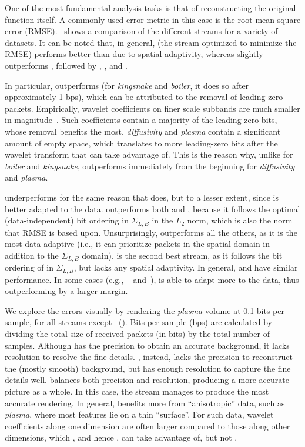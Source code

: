 One of the most fundamental analysis tasks is that of reconstructing the original function itself. A
commonly used error metric in this case is the root-mean-square error
(RMSE).~ shows a comparison of the different streams for a variety of
datasets. It can be noted that, in general, \srop (the stream optimized to minimize the RMSE)
performs better than \srsg due to spatial adaptivity, whereas \srsg slightly outperforms \swav,
followed by \sbit, \smag, and \slvl.

In particular, \sbit outperforms \slvl (for \emph{kingsnake} and \emph{boiler}, it does so after
approximately 1 bps), which can be attributed to the removal of leading-zero packets. Empirically,
wavelet coefficients on finer scale subbands are much smaller in magnitude~\cite{spiht1996}. Such
coefficients contain a majority of the leading-zero bits, whose removal benefits \sbit the most.
\emph{diffusivity} and \emph{plasma} contain a significant amount of empty space, which translates
to more leading-zero bits after the wavelet transform that \sbit can take advantage of. This is the
reason why, unlike for \emph{boiler} and \emph{kingsnake}, \sbit outperforms \slvl immediately from
the beginning for \emph{diffusivity} and \emph{plasma}.

\smag underperforms for the same reason that \slvl does, but to a lesser extent, since \smag is
better adapted to the data. \swav outperforms both \slvl and \sbit, because it follows the optimal
(data-independent) bit ordering in $\Sigma_{L,B}$ in the $L_2$ norm, which is also the norm that
RMSE is based upon. Unsurprisingly, \srop outperforms all the others, as it is the most
data-adaptive (i.e., it can prioritize packets in the spatial domain in addition to the
$\Sigma_{L,B}$ domain). \srsg is the second best stream, as it follows the bit ordering of \srop in
$\Sigma_{L,B}$, but lacks any spatial adaptivity. In general, \swav and \ssig have similar
performance. In some cases (e.g., ~ and~), \ssig is
able to adapt more to the data, thus outperforming \swav by a larger margin.

We explore the errors visually by rendering the \emph{plasma} volume at 0.1 bits per sample, for all
streams except \srop ~(). Bits per sample (bps) are calculated by dividing
the total size of received packets (in bits) by the total number of samples.  Although \slvl has the precision to obtain an accurate
background, it lacks resolution to resolve the fine details. \sbit, instead, lacks the precision to
reconstruct the (mostly smooth) background, but has enough resolution to capture the fine details
well. \swav balances both precision and resolution, producing a more accurate picture as a whole. In
this case, the \ssig stream manages to produce the most accurate rendering. In general, \srsg
benefits more from ``anisotropic'' data, such as \emph{plasma}, where most features lie on a thin
``surface''. For such data, wavelet coefficients along one dimension are often larger compared to
those along other dimensions, which \srop, and hence \srsg, can take advantage of, but not \swav.
